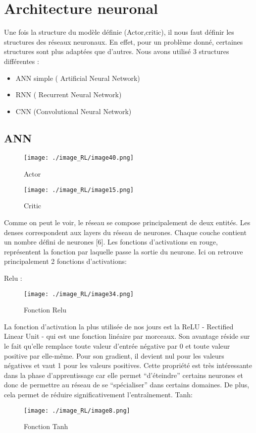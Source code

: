 \section{Architecture neuronal}
Une fois la structure du modèle définie (Actor,critic), il nous faut définir les structures des réseaux neuronaux.
En effet, pour un problème donné, certaines structures sont plus adaptées que d’autres.
Nous avons utilisé 3 structures différentes :

\begin{itemize}
    \item ANN simple ( Artificial Neural Network)
    \item RNN ( Recurrent Neural Network)
    \item CNN (Convolutional Neural Network)
\end{itemize}

\subsection{ANN}

\begin{figure}[H]
    \centering
    \texttt{[image: ./image\_RL/image40.png]}
    \caption{Actor}
\end{figure}

\begin{figure}[H]
    \centering
    \texttt{[image: ./image\_RL/image15.png]}
    \caption{Critic}
\end{figure}

Comme on peut le voir, le réseau se compose principalement de deux entités.
Les denses correspondent aux layers du réseau de neurones. Chaque couche contient un nombre défini de neurones [6].
Les fonctions d’activations en rouge, représentent la fonction par laquelle passe la sortie du neurone.\cite{ANN}
Ici on retrouve principalement 2 fonctions d’activations:

Relu :
\begin{figure}[H]
    \centering
    \texttt{[image: ./image\_RL/image34.png]}
    \caption{Fonction Relu}
\end{figure}

La fonction d'activation la plus utilisée de nos jours est la ReLU - Rectified Linear Unit - qui est une fonction linéaire par morceaux. Son avantage réside sur le fait qu'elle remplace toute valeur d'entrée négative par 0 et toute valeur positive par elle-même. Pour son gradient, il devient nul pour les valeurs négatives et vaut 1 pour les valeurs positives. Cette propriété est très intéressante dans la phase d'apprentissage car elle permet “d’éteindre” certains neurones et donc de permettre au réseau de se “spécialiser” dans certains domaines. De plus, cela permet de réduire significativement l'entraînement.
Tanh:
\begin{figure}[H]
    \centering
    \texttt{[image: ./image\_RL/image8.png]}
    \caption{Fonction Tanh}
\end{figure}

